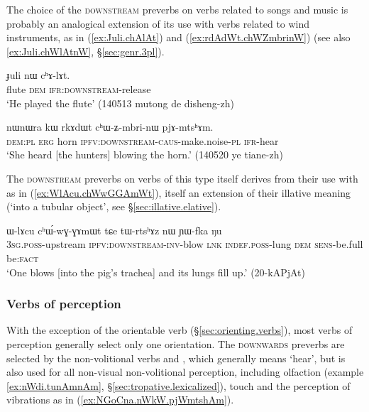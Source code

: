 The  choice of the \textsc{downstream} preverbs on verbs related to songs and music is probably an analogical extension of its use with verbs related to wind instruments, as in (\ref{ex:Juli.chAlAt}) and (\ref{ex:rdAdWt.chWZmbrinW}) (see also \ref{ex:Juli.chWlAtnW}, §\ref{sec:genr.3pl}).

\begin{exe}
\ex \label{ex:Juli.chAlAt}
\gll  ɟuli nɯ cʰɤ-lɤt. \\
flute \textsc{dem} \textsc{ifr}:\textsc{downstream}-release \\
\glt `He played the flute' (140513 mutong de disheng-zh) 
\end{exe}

\begin{exe}
\ex \label{ex:rdAdWt.chWZmbrinW}
\gll  nɯnɯra kɯ rkɤdɯt cʰɯ-ʑ-mbri-nɯ pjɤ-mtsʰɤm. \\
\textsc{dem}:\textsc{pl} \textsc{erg} horn \textsc{ipfv}:\textsc{downstream}-\textsc{caus}-make.noise-\textsc{pl} \textsc{ifr}-hear \\
\glt `She heard [the hunters] blowing the horn.' (140520 ye tiane-zh) 
\end{exe}

The \textsc{downstream} preverbs on verbs of this type itself derives from their use with  as in (\ref{ex:WlAcu.chWwGGAmWt}), itself an extension of their illative meaning (`into a tubular object', see §\ref{sec:illative.elative}).

\begin{exe}
\ex \label{ex:WlAcu.chWwGGAmWt}
\gll  ɯ-lɤcu cʰɯ́-wɣ-ɣɤmɯt tɕe tɯ-rtsʰɤz nɯ ɲɯ-fka ŋu \\
\textsc{3sg}.\textsc{poss}-upstream \textsc{ipfv}:\textsc{downstream}-\textsc{inv}-blow \textsc{lnk} \textsc{indef}.\textsc{poss}-lung \textsc{dem} \textsc{sens}-be.full be:\textsc{fact} \\
\glt  `One blows [into the pig's trachea] and its lungs fill up.' (20-kAPjAt) 
\end{exe}

\subsubsection{Verbs of perception}  \label{sec:preverb.perception} 
With the exception of the orientable verb  (§\ref{sec:orienting.verbs}), most verbs of perception generally select only one orientation. The  \textsc{downwards} preverbs are selected by the non-volitional  verbs  and , which generally means `hear', but is also used for all non-visual  non-volitional perception, including olfaction (example \ref{ex:nWdi.tunAmnAm}, §\ref{sec:tropative.lexicalized}), touch and the perception of vibrations as in  (\ref{ex:NGoCna.nWkW.pjWmtshAm}).
 

